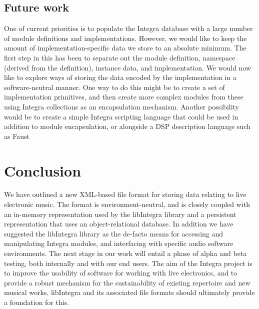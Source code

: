\documentclass[10pt,journal,final]{IEEEtran}
\begin{document}
\subsection{Future work}\label{subsec:future}

One of current priorities is to populate the Integra database with a large number of module definitions and implementations. However, we would like to keep the amount of implementation-specific data we store to an absolute minimum. The first step in this has been to separate out the module definition, namespace (derived from the definition), instance data, and implementation. We would now like to explore ways of storing the data encoded by the implementation in a software-neutral manner. One way to do this might be to create a set of implementation primitives, and then create more complex modules from these using Integra collections as an encapsulation mechanism. Another possibility would be to create a simple Integra scripting language that could be used in addition to module encapsulation, or alongside a DSP description language such as Faust \cite{Orlarey:02} 

\section{Conclusion}\label{sec:conclusion}

We have outlined a new XML-based file format for storing data relating to live electronic music. The format is environment-neutral, and is closely coupled with an in-memory representation used by the libIntegra library and a persistent representation that uses an object-relational database. In addition we have suggested the libIntegra library as the de-facto means for accessing and manipulating Integra modules, and interfacing with specific audio software environments. The next stage in our work will entail a phase of alpha and beta testing, both internally and with our end users. The aim of the Integra project is to improve the usability of software for working with live electronics, and to provide a robust mechanism for the sustainability of existing repertoire and new musical works. libIntegra and its associated file formats should ultimately provide a foundation for this.


\end{document}
